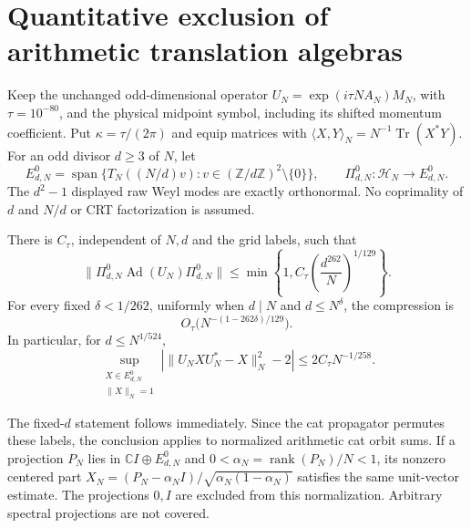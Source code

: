 \section{Quantitative exclusion of arithmetic translation algebras}
\label{sec:arithmetic-translation-exclusion}
Keep the unchanged odd-dimensional operator
$U_N=\exp(i\tau N A_N)M_N$, with $\tau=10^{-80}$, and the physical
midpoint symbol, including its shifted momentum coefficient. Put
$\kappa=\tau/(2\pi)$ and equip matrices with
$\langle X,Y\rangle_N=N^{-1}\operatorname{Tr}(X^*Y)$.
For an odd divisor $d\ge3$ of $N$, let
\[
 E^0_{d,N}=\operatorname{span}\{T_N((N/d)v):
 v\in(\mathbb Z/d\mathbb Z)^2\setminus\{0\}\},
 \qquad \Pi^0_{d,N}:\mathcal H_N\longrightarrow E^0_{d,N}.
\]
The $d^2-1$ displayed raw Weyl modes are exactly orthonormal. No
coprimality of $d$ and $N/d$ or CRT factorization is assumed.

\begin{theorem}
There is $C_\tau$, independent of $N,d$ and the grid labels, such that
\[
 \bigl\|\Pi^0_{d,N}\operatorname{Ad}(U_N)\Pi^0_{d,N}\bigr\|
 \le\min\left\{1,C_\tau\left(\frac{d^{262}}N\right)^{1/129}\right\}.
\]
For every fixed $\delta<1/262$, uniformly when $d\mid N$ and
$d\le N^\delta$, the compression is
\[ O_\tau\bigl(N^{-(1-262\delta)/129}\bigr). \]
In particular, for $d\le N^{1/524}$,
\[
 \sup_{\substack{X\in E^0_{d,N}\\\|X\|_N=1}}
 \left|\|U_N XU_N^*-X\|_N^2-2\right|
 \le 2C_\tau N^{-1/258}.
\]
\end{theorem}
The fixed-$d$ statement follows immediately. Since the cat propagator
permutes these labels, the conclusion applies to normalized arithmetic
cat orbit sums. If a projection $P_N$ lies in
$\mathbb CI\oplus E^0_{d,N}$ and
$0<\alpha_N=\operatorname{rank}(P_N)/N<1$, its nonzero centered part
$X_N=(P_N-\alpha_N I)/\sqrt{\alpha_N(1-\alpha_N)}$ satisfies the same
unit-vector estimate. The projections $0,I$ are excluded from this
normalization. Arbitrary spectral projections are not covered.

